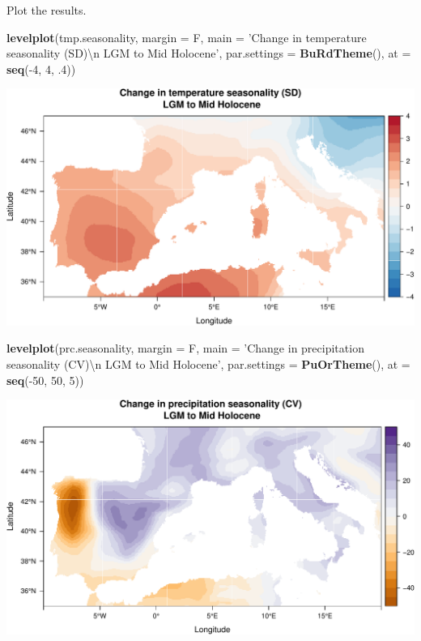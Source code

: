 \documentclass[11pt,]{tufte-handout}
\newenvironment{Shaded}{}{}
\newcommand{\KeywordTok}[1]{\textcolor[rgb]{0.00,0.44,0.13}{\textbf{{#1}}}}
\newcommand{\DataTypeTok}[1]{\textcolor[rgb]{0.56,0.13,0.00}{{#1}}}
\newcommand{\DecValTok}[1]{\textcolor[rgb]{0.25,0.63,0.44}{{#1}}}
\newcommand{\CharTok}[1]{\textcolor[rgb]{0.25,0.44,0.63}{{#1}}}
\newcommand{\StringTok}[1]{\textcolor[rgb]{0.25,0.44,0.63}{{#1}}}
\newcommand{\NormalTok}[1]{{#1}}
\begin{document}
Plot the results.

\begin{Shaded}
\begin{Highlighting}[]
\KeywordTok{levelplot}\NormalTok{(tmp.seasonality, }\DataTypeTok{margin =} \NormalTok{F, }
          \DataTypeTok{main =} \StringTok{'Change in temperature seasonality (SD)}\CharTok{\textbackslash{}n}\StringTok{ LGM to Mid Holocene'}\NormalTok{, }
          \DataTypeTok{par.settings =} \KeywordTok{BuRdTheme}\NormalTok{(), }
          \DataTypeTok{at =} \KeywordTok{seq}\NormalTok{(-}\DecValTok{4}\NormalTok{, }\DecValTok{4}\NormalTok{, .}\DecValTok{4}\NormalTok{))}
\end{Highlighting}
\end{Shaded}

\includegraphics{climate-analysis_files/figure-latex/unnamed-chunk-12-1}

\begin{Shaded}
\begin{Highlighting}[]
\KeywordTok{levelplot}\NormalTok{(prc.seasonality, }\DataTypeTok{margin =} \NormalTok{F, }
          \DataTypeTok{main =} \StringTok{'Change in precipitation seasonality (CV)}\CharTok{\textbackslash{}n}\StringTok{ LGM to Mid Holocene'}\NormalTok{, }
          \DataTypeTok{par.settings =} \KeywordTok{PuOrTheme}\NormalTok{(), }
          \DataTypeTok{at =} \KeywordTok{seq}\NormalTok{(-}\DecValTok{50}\NormalTok{, }\DecValTok{50}\NormalTok{, }\DecValTok{5}\NormalTok{))}
\end{Highlighting}
\end{Shaded}

\includegraphics{climate-analysis_files/figure-latex/unnamed-chunk-12-2}
\end{document}

